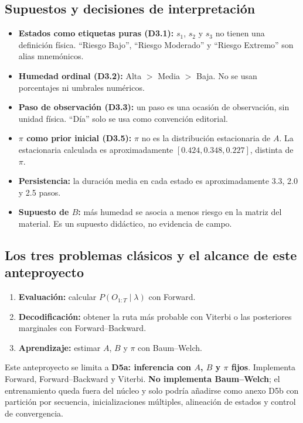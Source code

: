 \documentclass[11pt,a4paper]{article}
\begin{document}
\subsection{Supuestos y decisiones de interpretación}

\begin{itemize}
  \item \textbf{Estados como etiquetas puras (D3.1):} \(s_1\), \(s_2\) y \(s_3\) no tienen una definición física. ``Riesgo Bajo'', ``Riesgo Moderado'' y ``Riesgo Extremo'' son alias mnemónicos.
  \item \textbf{Humedad ordinal (D3.2):} Alta \(>\) Media \(>\) Baja. No se usan porcentajes ni umbrales numéricos.
  \item \textbf{Paso de observación (D3.3):} un paso es una ocasión de observación, sin unidad física. ``Día'' solo se usa como convención editorial.
  \item \textbf{\(\pi\) como prior inicial (D3.5):} \(\pi\) no es la distribución estacionaria de \(A\). La estacionaria calculada es aproximadamente \([0.424,0.348,0.227]\), distinta de \(\pi\).
  \item \textbf{Persistencia:} la duración media en cada estado es aproximadamente 3.3, 2.0 y 2.5 pasos.
  \item \textbf{Supuesto de \(B\):} más humedad se asocia a menos riesgo en la matriz del material. Es un supuesto didáctico, no evidencia de campo.
\end{itemize}

\subsection{Los tres problemas clásicos y el alcance de este anteproyecto}

\begin{enumerate}
  \item \textbf{Evaluación:} calcular \(P(O_{1:T}\mid\lambda)\) con Forward.
  \item \textbf{Decodificación:} obtener la ruta más probable con Viterbi o las posteriores marginales con Forward--Backward.
  \item \textbf{Aprendizaje:} estimar \(A\), \(B\) y \(\pi\) con Baum--Welch.
\end{enumerate}

Este anteproyecto se limita a \textbf{D5a: inferencia con \(A\), \(B\) y \(\pi\) fijos}. Implementa Forward, Forward--Backward y Viterbi. \textbf{No implementa Baum--Welch}; el entrenamiento queda fuera del núcleo y solo podría añadirse como anexo D5b con partición por secuencia, inicializaciones múltiples, alineación de estados y control de convergencia.
\end{document}
